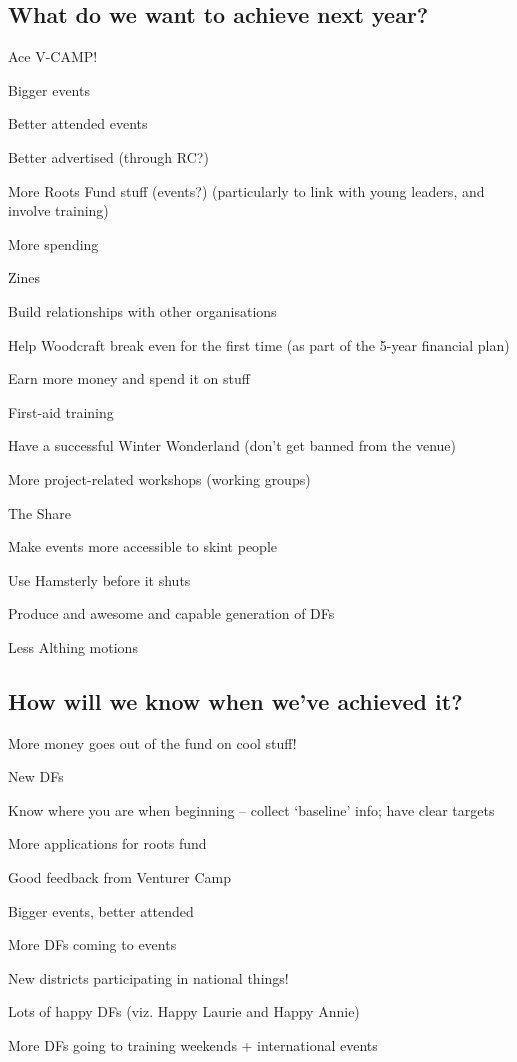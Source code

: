 \documentclass[a4paper, 12pt]{article}
\begin{document}
\subsection{What do we want to achieve next year?}
\begin{itemize*}
	\item Ace V-CAMP!
	\item Bigger events
	\item Better attended events
	\item Better advertised (through RC?)
	\item More Roots Fund stuff (events?) (particularly to link with young leaders, and involve training)
	\item More spending
	\item Zines
	\item Build relationships with other organisations
	\item Help Woodcraft break even for the first time (as part of the 5-year financial plan)
	\item Earn more money and spend it on stuff
	\item First-aid training
	\item Have a successful Winter Wonderland (don't get banned from the venue)
	\item More project-related workshops (working groups)
	\item The Share
	\item Make events more accessible to skint people
	\item Use Hamsterly before it shuts
	\item Produce and awesome and capable generation of DFs
	\item Less Althing motions
\end{itemize*}

\subsection{How will we know when we've achieved it?}
\begin{itemize*}
	\item More money goes out of the fund on cool stuff!
	\item New DFs
	\item Know where you are when beginning -- collect `baseline' info; have clear targets
	\item More applications for roots fund
	\item Good feedback from Venturer Camp
	\item Bigger events, better attended
	\item More DFs coming to events
	\item New districts participating in national things!
	\item Lots of happy DFs (viz. Happy Laurie and Happy Annie)
	\item More DFs going to training weekends + international events
\end{itemize*}
\end{document}
